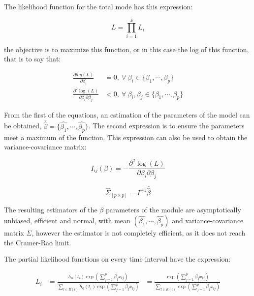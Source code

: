 \documentclass[11pt]{book} %
\begin{document}
      The likelihood function for the total mode has this expression:

      \begin{equation}
        L = \prod_{i=1}^kL_i
        \label{eq:cox-partial-likelihood-prod}
      \end{equation}

      the objective is to maximize this function, or in this case the log of this function, that is to say that:

      \begin{equation}
        \begin{aligned}
          \frac{\partial log(L)}{\partial\beta_i} & = 0, \ \forall \ \beta_i \in \{\beta_1,\cdots,\beta_p\} \\
          \frac{\partial^2 \log(L)}{\partial\beta_i\partial\beta_j} & < 0,  \ \forall \ \beta_i,\beta_j \in \{\beta_1,\cdots,\beta_p\}
        \end{aligned}
        \label{eq:cox-max-likelihood-conditions}
      \end{equation}

      From the first of the equations, an estimation of the parameters of the model can be obtained, $\bar{\widehat{\beta}} = \{\widehat{\beta_1},\cdots,\widehat{\beta_p}\}$. The second expression is to ensure the parameters meet a maximum of the function. This expression can also be used to obtain the variance-covariance matrix:

      \begin{equation}
        I_{ij}(\beta) = - \frac{\partial^2\log(L)}{\partial\beta_i\partial\beta_j}
        \label{eq:cox-information matrix}
      \end{equation}

      \begin{equation}
        \widehat{\Sigma}_{[p\times p]} = I ^{-1} \bar{\widehat{\beta}}
        \label{eq:cox-variance-covariance-matrix-estimated}
      \end{equation}

      The resulting estimators of the $\beta$ parameters of the module are asymptotically unbiased, efficient and normal, with mean $(\widehat{\beta_1},\cdots,\widehat{\beta_p})$ and variance-covariance matrix $\widehat{\Sigma}$, however the estimator is not completely efficient, as it does not reach the Cramer-Rao limit.

      The partial likelihood functions on every time interval have the expression:

      \begin{equation}
        \begin{aligned}
          L_i & = \frac{h_0(t_i)\exp\left(\sum_{j=1}^p\beta_jx_{ij}\right)}{\sum_{l\in R(t)}h_0(t_i)\exp\left(\sum_{j=1}^p\beta_jx_{lj}\right)}
          & = \frac{\exp\left(\sum_{j=1}^p\beta_jx_{ij}\right)}{\sum_{l\in R(t)}\exp\left(\sum_{j=1}^p\beta_jx_{lj}\right)}
        \end{aligned}
        \label{eq:cox-partial-likelihood-expression}
      \end{equation}
\end{document}
